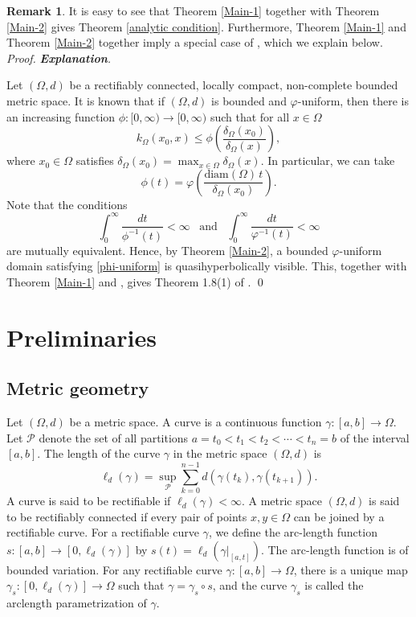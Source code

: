 \documentclass[a4paper,12pt]{amsart}
\theoremstyle{definition}
\newtheorem{rem}{Remark}[section]
\newcounter {own}
\newenvironment{pf}[1][]{%
	\vskip 3mm
	\noindent
	\ifthenelse{\equal{#1}{}}%
	{{\slshape Proof. }}%
	{{\slshape #1.} }%
}%
{\qed\bigskip}
\begin{document}
\begin{rem}
	It is easy to see that Theorem \ref{Main-1} together with Theorem \ref{Main-2} gives Theorem \ref{analytic condition}. Furthermore, Theorem \ref{Main-1} and Theorem \ref{Main-2} together imply a special case of \cite[Theorem 1.8(1)]{Zhou-2022}, which we explain below.
	\begin{pf}[\textbf{Explanation}]
		Let $(\Omega,d)$ be a rectifiably connected, locally compact, non-complete bounded metric space. It is known that if $(\Omega,d)$ is bounded and $\varphi$-uniform, then there is an increasing function $\phi:[0,\infty)\to [0,\infty)$ such that for all $x\in \Omega$
		$$k_{\Omega}(x_0,x)\le \phi\left(\frac{\delta_{\Omega}(x_0)}{\delta_{\Omega}(x)}\right),$$
		where $x_0\in \Omega$ satisfies $\delta_{\Omega}(x_0)=\max_{x\in \Omega}\delta_{\Omega}(x)$. In particular, we can take
		$$\phi(t)=\varphi\left(\frac{\mbox{diam}(\Omega)\,t}{\delta_{\Omega}(x_0)}\right).$$
		Note that the conditions
		\begin{equation}\label{phi-uniform}
			\int_{0}^{\infty}\frac{dt}{\phi^{-1}(t)}<\infty \,\,\, \mbox{ and }\,\,\, \int_{0}^{\infty}\frac{dt}{\varphi^{-1}(t)}<\infty
		\end{equation}
		are mutually equivalent. Hence, by Theorem \ref{Main-2}, a bounded $\varphi$-uniform domain satisfying \eqref{phi-uniform} is quasihyperbolically visible. This, together with Theorem \ref{Main-1} and \cite[Theorem 5.1]{Koskela-2014}, gives Theorem 1.8(1) of \cite{Zhou-2022}.
	\end{pf}
\end{rem}
	
\section{Preliminaries}

\subsection{Metric geometry}
Let $(\Omega,d)$ be a metric space. A curve is a continuous function $\gamma:[a,b]\rightarrow \Omega$. Let $\mathcal{P}$ denote the set of all partitions $a = t_{0}<t_{1}<t_{2}< \cdots<t_{n}=b$ of the interval $[a,b]$. The length of the curve $\gamma$ in the metric space $(\Omega,d)$ is
$$\ell_{d}(\gamma) = \sup_{\mathcal{P}} \sum_{k=0}^{n-1}d(\gamma(t_{k}), \gamma(t_{k+1})).$$
A curve is said to be rectifiable if $\ell_d(\gamma) < \infty$. A metric space $(\Omega,d)$ is said to be rectifiably connected if every pair of points $x,y \in \Omega$ can be joined by a rectifiable curve. For a rectifiable curve $\gamma$, we define the arc-length function $s:[a,b]\rightarrow \left[ 0,\ell_d(\gamma) \right]$ by $s(t) = \ell_{d}(\gamma|_{[a,t]})$. The arc-length function is of bounded variation. For any rectifiable curve $\gamma:[a,b]\to \Omega$, there is a unique map $\gamma_s:[0,\ell_d(\gamma)]\to \Omega$ such that $\gamma=\gamma_s\circ s$, and the curve $\gamma_s$ is called the arclength parametrization of $\gamma$.
\end{document}
